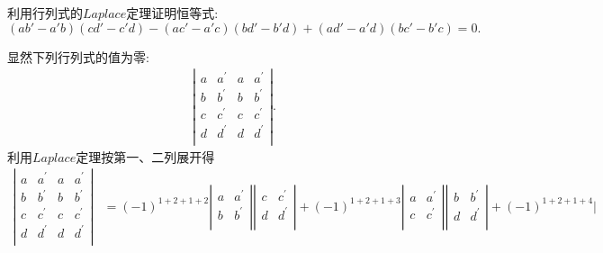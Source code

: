 \documentclass[lang=cn,newtx,10pt,scheme=chinese]{elegantbook}
\begin{document}
\begin{exercise}
    利用行列式的$Laplace$定理证明恒等式:
    \[
    (ab' - a'b)(cd' - c'd)-(ac' - a'c)(bd' - b'd)+(ad' - a'd)(bc' - b'c)=0.
    \]
\end{exercise}
\begin{solution}
    显然下列行列式的值为零:
    \begin{align*}
        \left| \begin{matrix}
            a&		a^{\prime}&		a&		a^{\prime}\\
            b&		b^{\prime}&		b&		b^{\prime}\\
            c&		c^{\prime}&		c&		c^{\prime}\\
            d&		d^{\prime}&		d&		d^{\prime}\\
        \end{matrix} \right|.
    \end{align*}
利用$Laplace$定理按第一、二列展开得
\begin{align*}
    \left| \begin{matrix}
        a&		a^{\prime}&		a&		a^{\prime}\\
        b&		b^{\prime}&		b&		b^{\prime}\\
        c&		c^{\prime}&		c&		c^{\prime}\\
        d&		d^{\prime}&		d&		d^{\prime}\\
    \end{matrix} \right|&=\left( -1 \right) ^{1+2+1+2}\left| \begin{matrix}
        a&		a^{\prime}\\
        b&		b^{\prime}\\
    \end{matrix} \right|\left| \begin{matrix}
        c&		c^{\prime}\\
        d&		d^{\prime}\\
    \end{matrix} \right|+\left( -1 \right) ^{1+2+1+3}\left| \begin{matrix}
        a&		a^{\prime}\\
        c&		c^{\prime}\\
    \end{matrix} \right|\left| \begin{matrix}
        b&		b^{\prime}\\
        d&		d^{\prime}\\
    \end{matrix} \right|+\left( -1 \right) ^{1+2+1+4}\left| \begin{matrix}

\end{matrix}
\end{align*}
\end{solution}
\end{document}
